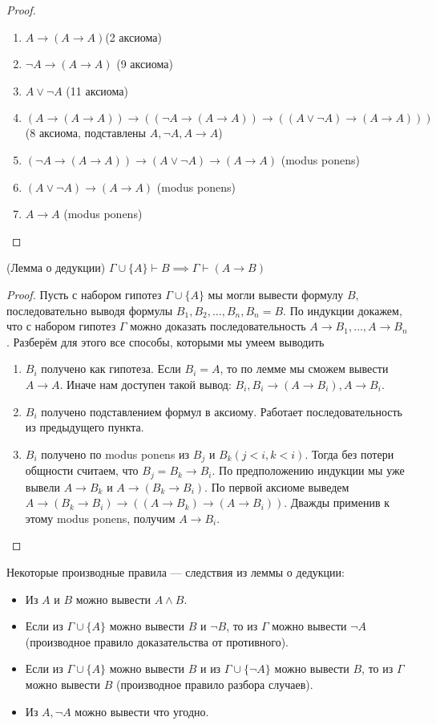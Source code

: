 \documentclass{article}
\begin{document}
\begin{proof}
	\begin{enumerate}
		\item $A \to (A \to A)$(2 аксиома)
		\item $\lnot A \to (A \to A)$ (9 аксиома)
		\item $A \lor \lnot A$ (11 аксиома)
		\item $(A \to (A \to A)) \to ((\lnot A \to (A \to A)) \to ((A \lor \lnot A) \to (A \to A)))$ (8 аксиома, подставлены $A, \lnot A, A \to A$)
		\item $(\lnot A \to (A \to A)) \to (A \lor \lnot A) \to (A \to A)$ (modus ponens)
		\item $(A \lor \lnot A) \to (A \to A)$ (modus ponens)
		\item $A \to A$ (modus ponens)
	\end{enumerate}
\end{proof}

\begin{theorem}{(Лемма о дедукции)}
	$\Gamma \cup \{A\} \vdash B \implies \Gamma \vdash (A \to B)$
\end{theorem}

\begin{proof}
	Пусть с набором гипотез $\Gamma \cup \{A\}$ мы могли вывести формулу $B$, последовательно выводя формулы $B_1, B_2, \ldots, B_n, B_n = B$. По индукции докажем, что с набором гипотез $\Gamma$ можно доказать последовательность $A \to B_1, \ldots, A \to B_n$. Разберём для этого все способы, которыми мы умеем выводить
	\begin{enumerate}
	\item $B_i$ получено как гипотеза. Если $B_i = A$, то по лемме мы сможем вывести $A \to A$. Иначе нам доступен такой вывод: $B_i, B_i \to (A \to B_i), A \to B_i$.
	\item $B_i$ получено подставлением формул в аксиому. Работает последовательность из предыдущего пункта.
	\item $B_i$ получено по modus ponens из $B_j$ и $B_k(j < i , k < i)$. Тогда без потери общности считаем, что $B_j = B_k \to B_i$. По предположению индукции мы уже вывели $A \to B_k$ и $A \to (B_k \to B_i)$. По первой аксиоме выведем $A \to (B_k \to B_i) \to ((A \to B_k) \to (A \to B_i))$. Дважды применив к этому modus ponens, получим $A \to B_i$.
	\end{enumerate}
\end{proof}
Некоторые производные правила --- следствия из леммы о дедукции:
\begin{itemize}
	\item Из $A$ и $B$ можно вывести $A \land B$.
	\item Если из $\Gamma \cup \{A\}$ можно вывести $B$ и $\lnot B$, то из $\Gamma$ можно вывести $\lnot A$ (производное правило доказательства от противного).
	\item Если из $\Gamma \cup \{A\}$ можно вывести $B$ и из $\Gamma \cup \{\lnot A\}$ можно вывести $B$, то из $\Gamma$ можно вывести $B$ (производное правило разбора случаев).
	\item Из $A, \lnot A$ можно вывести что угодно.
\end{itemize}
\end{document}
